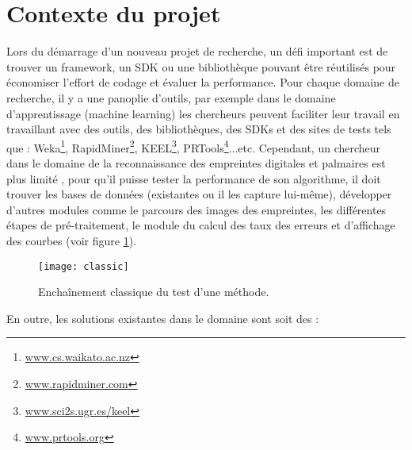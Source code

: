 \section{Contexte du projet}
Lors du démarrage d'un nouveau projet de recherche, un défi important est de trouver un framework, un SDK ou une bibliothèque pouvant être réutilisés pour économiser l'effort de codage et évaluer la performance. Pour chaque domaine de recherche, il y a une panoplie d'outils, par exemple dans le domaine d'apprentissage (machine learning) les chercheurs peuvent faciliter leur travail en travaillant avec des outils, des bibliothèques, des SDKs et des sites de tests tels que : Weka\footnote{\href{http://www.cs.waikato.ac.nz/ml/weka/}{www.cs.waikato.ac.nz}}, RapidMiner\footnote{\href{https://rapidminer.com/}{www.rapidminer.com}}, KEEL\footnote{\href{http://sci2s.ugr.es/keel/description.php}{www.sci2s.ugr.es/keel}}, PRTools\footnote{\href{http://prtools.org/}{www.prtools.org}}...etc. 
Cependant, un chercheur dans le domaine de la reconnaissance des empreintes digitales et palmaires est plus limité \citep{maltoni2009handbook}, pour qu'il puisse tester la performance de son algorithme, il doit trouver les bases de données (existantes ou il les capture lui-même), développer d'autres modules comme le parcours des images des empreintes, les différentes étapes de pré-traitement, le module du calcul des taux des erreurs et d'affichage des courbes (voir figure \ref{fig:classic}).
\begin{figure}[H]
	\centering
	\texttt{[image: classic]}
	\caption{Enchaînement classique du test d'une méthode.}
	\label{fig:classic}
\end{figure}
En outre, les solutions existantes dans le domaine sont soit des :
